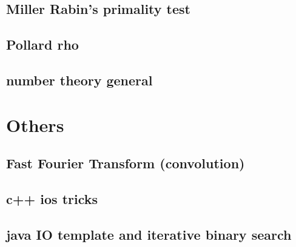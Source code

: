 \subsection{Miller Rabin's primality test}
\raggedbottom
\hrulefill
\subsection{Pollard rho}
\raggedbottom
\hrulefill
\subsection{number theory general}
\raggedbottom
\hrulefill

\section{Others}
\subsection{Fast Fourier Transform (convolution)}
\raggedbottom
\hrulefill
\subsection{c++ ios tricks}
\raggedbottom
\hrulefill
\subsection{java IO template and iterative binary search}
\raggedbottom
\hrulefill

